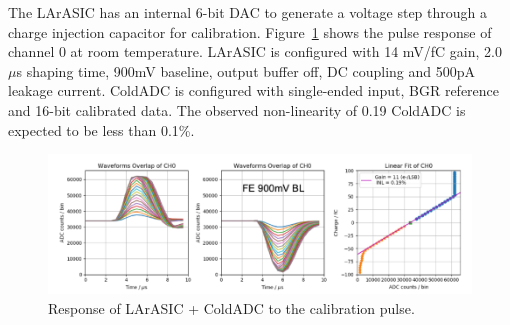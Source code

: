 \label{sec:4.4}
The LArASIC has an internal 6-bit DAC to generate a voltage step through a charge injection 
capacitor for calibration. Figure~\ref{fig:calibpulse} shows the pulse response of channel 0 at 
room temperature.  LArASIC is configured with 14 mV/fC gain, 2.0 $\mu$s shaping time, 
900mV baseline, output buffer off, DC coupling and 500pA leakage current. ColdADC is configured 
with single-ended input, BGR reference and 16-bit calibrated data. The observed non-linearity of 
0.19%
ColdADC is expected to be less than 0.1\%.   
\begin{figure}[h!]
\centering
  \includegraphics[width=1.0\linewidth]{figures/calibpulse.png}
  \caption{Response of LArASIC + ColdADC to the calibration pulse.}
  \label{fig:calibpulse}
\end{figure}

